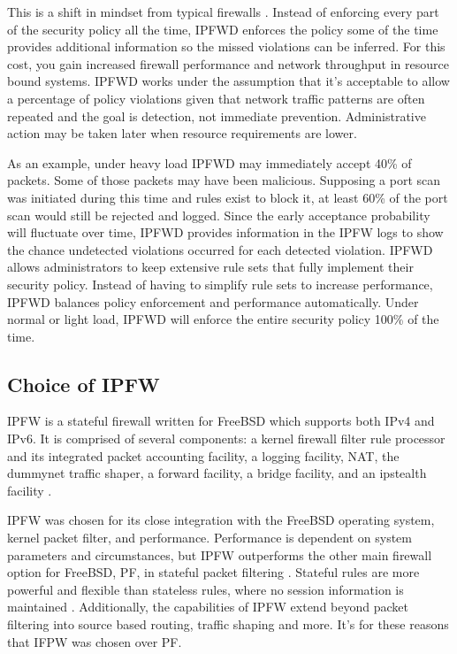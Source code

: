 \documentclass[journal]{IEEEtran}
\begin{document}
  This is a shift in mindset from typical firewalls \cite{networksecurity}.
  Instead of enforcing every part of the security policy all the time, IPFWD
  enforces the policy some of the time provides additional information so the
  missed violations can be inferred. For this cost, you gain increased firewall
  performance and network throughput in resource bound systems. IPFWD works
  under the assumption that it's acceptable to allow a percentage of policy
  violations given that network traffic patterns are often repeated and the
  goal is detection, not immediate prevention. Administrative action may be
  taken later when resource requirements are lower.

  As an example, under heavy load IPFWD may immediately accept 40\% of packets.
  Some of those packets may have been malicious. Supposing a port scan was
  initiated during this time and rules exist to block it, at least 60\% of the
  port scan would still be rejected and logged. Since the early acceptance
  probability will fluctuate over time, IPFWD provides information in the IPFW
  logs to show the chance undetected violations occurred for each detected
  violation. IPFWD allows administrators to keep extensive rule sets that fully
  implement their security policy. Instead of having to simplify rule sets to
  increase performance, IPFWD balances policy enforcement and performance
  automatically. Under normal or light load, IPFWD will enforce the entire
  security policy 100\% of the time.

  \subsection{Choice of IPFW}

    IPFW is a stateful firewall written for FreeBSD which supports both IPv4
    and IPv6. It is comprised of several components: a kernel firewall filter
    rule processor and its integrated packet accounting facility, a logging
    facility, NAT, the dummynet traffic shaper, a forward facility, a bridge
    facility, and an ipstealth facility \cite{freebsdhandbook}.

    IPFW was chosen for its close integration with the FreeBSD operating
    system, kernel packet filter, and performance. Performance is dependent on
    system parameters and circumstances, but IPFW outperforms the other main
    firewall option for FreeBSD, PF, in stateful packet filtering
    \cite{ipfwvspf}. Stateful rules are more powerful and flexible than
    stateless rules, where no session information is maintained
    \cite{networksecurity}.  Additionally, the capabilities of IPFW extend
    beyond packet filtering into source based routing, traffic shaping and
    more. It's for these reasons that IFPW was chosen over PF.
\end{document}
